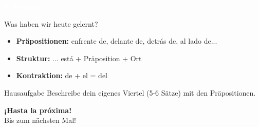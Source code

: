 \documentclass[aspectratio=169,11pt]{beamer}
\newcommand{\phase}[1]{\begin{center}\colorbox{spanisch}{\textcolor{white}{\large\bfseries #1}}\end{center}}
\begin{document}

\begin{frame}{}
\phase{Sicherung}
\end{frame}

\begin{frame}{Was haben wir heute gelernt?}
\begin{itemize}
\setlength\itemsep{1em}
\item[\textcolor{spanisch}{\checkmark}] \textbf{Präpositionen:} enfrente de, delante de, detrás de, al lado de...
\item[\textcolor{spanisch}{\checkmark}] \textbf{Struktur:} ... está + Präposition + Ort
\item[\textcolor{spanisch}{\checkmark}] \textbf{Kontraktion:} de + el = del
\end{itemize}

\vspace{1cm}

\begin{block}{Hausaufgabe}
Beschreibe dein eigenes Viertel (5-6 Sätze) mit den Präpositionen.
\end{block}
\end{frame}

\begin{frame}{}
\begin{center}
{\Huge\bfseries\textcolor{spanisch}{¡Hasta la próxima!}}\\[1cm]
{\Large Bis zum nächsten Mal!}
\end{center}
\end{frame}
\end{document}
